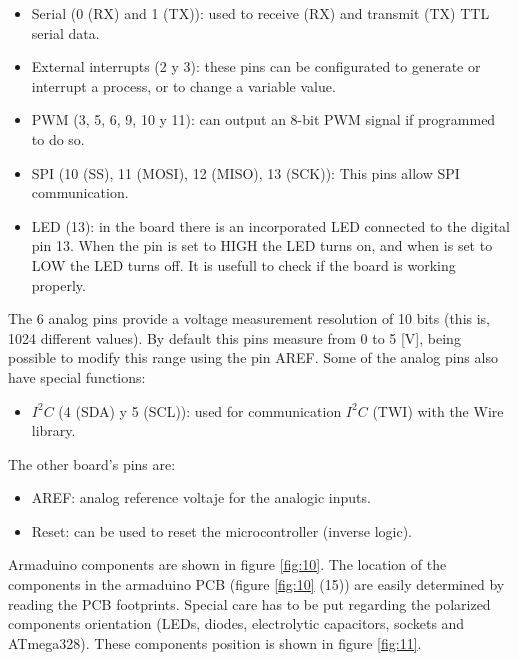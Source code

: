 \documentclass[12pt,letterpaper]{article}
\numberwithin{figure}{section}
\numberwithin{equation}{section}
\numberwithin{table}{section}
\begin{document}
\begin{itemize}
    \item Serial (0 (RX) and 1 (TX)): used to receive (RX) and transmit (TX) TTL serial data.
    \item External interrupts (2 y 3): these pins can be configurated to generate or interrupt a process, or to change a variable value.
    \item PWM (3, 5, 6, 9, 10 y 11): can output an 8-bit PWM signal if programmed to do so.
    \item SPI (10 (SS), 11 (MOSI), 12 (MISO), 13 (SCK)): This pins allow SPI communication.
    \item LED (13): in the board there is an incorporated LED connected to the digital pin 13. When the pin is set to HIGH the LED turns on, and when is set to LOW the LED turns off. It is usefull to check if the board is working properly.
\end{itemize}

The 6 analog pins provide a voltage measurement resolution of 10 bits (this is, 1024 different values). By default this pins measure from 0 to 5 [V], being possible to modify this range using the pin AREF. Some of the analog pins also have special functions:

\begin{itemize}
    \item $I^2C$ (4 (SDA) y 5 (SCL)): used for communication $I^2C$ (TWI) with the Wire library.
\end{itemize}

The other board's pins are:

\begin{itemize}
    \item AREF: analog reference voltaje for the analogic inputs.
    \item Reset: can be used to reset the microcontroller (inverse logic).
\end{itemize}

Armaduino components are shown in figure \ref{fig:10}. The location of the components in the armaduino PCB (figure \ref{fig:10} (15)) are easily determined by reading the PCB footprints. Special care has to be put regarding the polarized components orientation (LEDs, diodes, electrolytic capacitors, sockets and ATmega328). These components position is shown in figure \ref{fig:11}.
\end{document}
